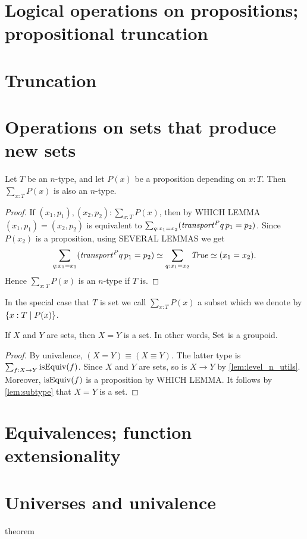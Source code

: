 \section{Logical operations on propositions; propositional truncation}
\label{sec:logical-operations}

\section{Truncation}
\label{sec:truncation}

\section{Operations on sets that produce new sets}
\label{sec:operations-on-sets}

\begin{lemma}\label{lem:subtype}
Let $T$ be an $n$-type, and let $P(x)$ be a proposition depending on $x:T$. 
Then $\sum_{x:T} P(x)$ is also an $n$-type.
\end{lemma}

\begin{proof}
If $(x_1,p_1),(x_2,p_2) : \sum_{x:T} P(x)$, then by WHICH LEMMA
$(x_1,p_1)=(x_2,p_2)$ is equivalent to 
$\sum_{q:x_1=x_2} (\mathord{\mathit{transport}}^P q\,p_1 = p_2)$. 
Since $P(x_2)$ is a proposition, using SEVERAL LEMMAS we get 
\[
\sum_{q:x_1=x_2} ({\mathord{\mathit{transport}}}^P q\,p_1 = p_2) \simeq 
\sum_{q:x_1=x_2} \mathop{\mathit{True}} \simeq (x_1=x_2).
\]
Hence $\sum_{x:T} P(x)$ is an $n$-type if $T$ is.
\end{proof}
In the special case that $T$ is set we call 
$\sum_{x:T} P(x)$ a subset which we denote by 
$\{x:T \mid P(x)\}$.

\begin{lemma}\label{lem:eq_of_sets-is-set}
If $X$ and $Y$ are sets, then $X=Y$ is a set. 
In other words, $\mathord{\mathrm{Set}}$ is a groupoid.
\end{lemma}

\begin{proof}
By univalence, $(X=Y) \equiv (X\equiv Y)$. The latter type is
$\sum_{f:X\to Y} \mathrm{isEquiv}(f)$. Since $X$ and $Y$ are sets,
so is $X\to Y$ by \cref{lem:level_n_utils}. Moreover,
$\mathrm{isEquiv}(f)$ is a proposition by WHICH LEMMA.
It follows by \cref{lem:subtype} that $X=Y$ is a set.  
\end{proof}


\section{Equivalences; function extensionality}
\label{sec:equivalences}

\section{Universes and univalence}
\label{sce:universes}

\begin{theorem} theorem \end{theorem}


